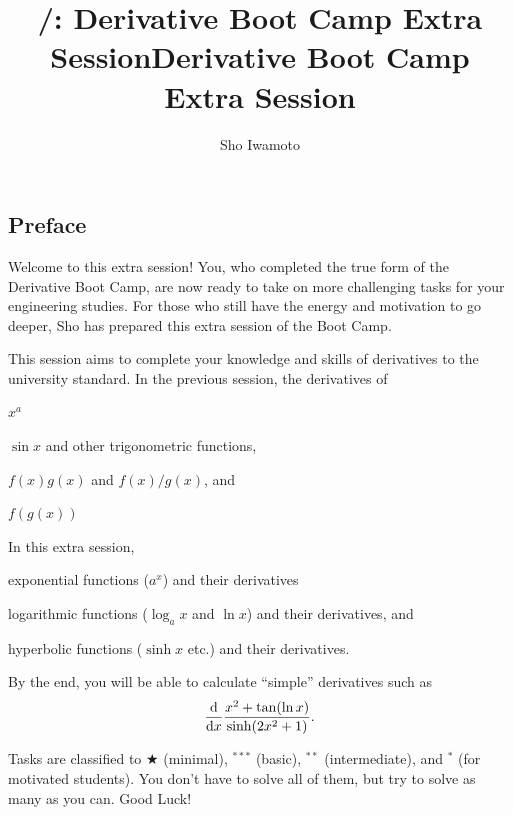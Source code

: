 \documentclass[11pt,pdfa,lastpage]{MishoNote}
\title{\LectureName/: Derivative Boot Camp Extra Session}
\author{Sho Iwamoto}
\let\origfootnote\footnote
\let\origfootnoterule\footnoterule
\begin{document}
%
\title{Derivative Boot Camp Extra Session}\begin{maketitle}
\let\footnote\origfootnote
\let\footnoterule\origfootnoterule

\subsection*{Preface}
Welcome to this extra session!
You, who completed the true form of the Derivative Boot Camp, are now ready to take on more challenging tasks for your engineering studies.
For those who still have the energy and motivation to go deeper, Sho has prepared this extra session of the Boot Camp.

This session aims to complete your knowledge and skills of derivatives to the university standard.
In the previous session,  the derivatives of
\begin{miniitemize}
  \item $x^a$
  \item $\sin x$ and other trigonometric functions,
  \item $f(x)g(x)$ and $f(x)/g(x)$, and
  \item $f(g(x))$
\end{miniitemize}
In this extra session, 
\begin{miniitemize}
  \item exponential functions ($a^x$) and their derivatives
  \item logarithmic functions ($\log_a x$ and $\ln x$) and their derivatives, and
  \item hyperbolic functions ($\sinh x$ etc.) and their derivatives.
\end{miniitemize}
By the end, you will be able to calculate ``simple'' derivatives such as
\[
\diff{}{x}\frac{x^2+\tan(\ln x)}{\sinh(2x^2+1)}.
\]

Tasks are classified to $\bigstar$ (minimal), $^{***}$ (basic), $^{**}$ (intermediate), and $^{*}$ (for motivated students).
You don't have to solve all of them, but try to solve as many as you can.
Good Luck!

\enlargethispage{-5em}


\end{maketitle}
\end{document}
